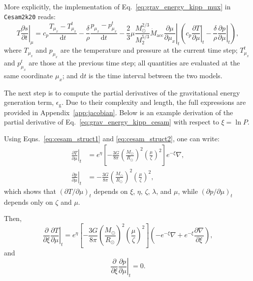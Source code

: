 \documentclass[12pt,a4paper]{article}
\newcommand{\mr}{\mathrm}
\newcommand{\pfird}[2][]{\frac{\partial#1}{\partial#2}}
\newcommand{\dd}[1]{\mathrm{d}#1}
\begin{document}
More explicitly, the implementation of Eq.~\eqref{eq:grav_energy_kipp_mux} in \texttt{Cesam2k20} reads:
\begin{equation}
  T\left.\pfird[s]{t}\right|_\mu = c_p\frac{T_{\mu_x} - T_{\mu_x}^t}{\dd{t}} - \frac{\delta}{\rho}\frac{p_{\mu_x} - p_{\mu_x}^t}{\dd{t}} - \frac{2}{3}\mu\frac{M_\odot^{2/3}}{M_2^{5/3}}\dot{M}_\mr{acc}\left.\pfird[\mu]{\mu_x}\right|_t\left(c_p\left.\pfird[T]{\mu}\right|_t - \frac{\delta}{\rho}\left.\pfird[p]{\mu}\right|_t\right), \label{eq:grav_energy_kipp_cesam}
\end{equation}
where $T_{\mu_x}$ and $p_{\mu_x}$ are the temperature and pressure at the current time step; $T_{\mu_x}^t$ and $p_{\mu_x}^t$ are those at the previous time step; all quantities are evaluated at the same coordinate $\mu_x$; and $\dd{t}$ is the time interval between the two models. 

The next step is to compute the partial derivatives of the gravitational energy generation term, $\epsilon_\mr{g}$. Due to their complexity and length, the full expressions are provided in Appendix~\ref{app:jacobian}. Below is an example derivation of the partial derivative of Eq.~\eqref{eq:grav_energy_kipp_cesam} with respect to $\xi = \ln P$.

Using Eqns.~\eqref{eq:cesam_struct1} and \eqref{eq:cesam_struct2}, one can write: 
\begin{align}
  \left.\pfird[T]{\mu}\right|_t &= e^\eta\left[-\frac{3G}{8\pi}\left(\frac{M_\odot}{R_\odot}\right)^2\left(\frac{\mu}{\zeta}\right)^2\right]e^{-\xi}\nabla,\\
  \left.\pfird[p]{\mu}\right|_t &= -\frac{3G}{8\pi}\left(\frac{M_\odot}{R_\odot}\right)^2\left(\frac{\mu}{\zeta}\right)^2,
\end{align}
which shows that $\left(\partial T/\partial \mu\right)_t$ depends on $\xi$, $\eta$, $\zeta$, $\lambda$, and $\mu$, while $\left(\partial p/\partial \mu\right)_t$ depends only on $\zeta$ and $\mu$.

Then, 
\begin{equation}
  \pfird[]{\xi}\left.\pfird[T]{\mu}\right|_t = e^\eta\left[-\frac{3G}{8\pi}\left(\frac{M_\odot}{R_\odot}\right)^2\left(\frac{\mu}{\zeta}\right)^2\right]\left(-e^{-\xi}\nabla + e^{-\xi}\pfird[\nabla]{\xi}\right),
\end{equation}
and 
\begin{equation}
  \pfird[]{\xi}\left.\pfird[p]{\mu}\right|_t = 0.
\end{equation}
\end{document}
